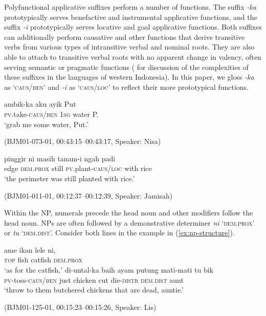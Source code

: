 \documentclass[output=paper,
\ChapterDOI{10.5281/zenodo.15697583}
colorlinks,
citecolor=brown]{langscibook}
\begin{document}
Polyfunctional applicative suffixes perform a number of functions. The suffix \textit{-ka} prototypically serves benefactive and instrumental applicative functions, and the suffix \textit{-i} prototypically serves locative and goal applicative functions. Both suffixes can additionally perform causative and other functions that derive transitive verbs from various types of intransitive verbal and nominal roots. They are also able to attach to transitive verbal roots with no apparent change in valency, often serving semantic or pragmatic functions (\cite[see][]{truong2022neglected,mcdonnell2024applicative} for discussion of the complexities of these suffixes in the languages of western Indonesia). In this paper, we gloss  \textit{-ka} as `\textsc{caus/ben}' and \textit{-i} as `\textsc{caus/loc}' to reflect their more prototypical functions.

\begin{exe}
    \ex\label{ex:appl-ka} 
    \begin{xlist}
        \exi{}
        \gll ambik-ka aku ayik Put\\
        \textsc{pv}.take-\textsc{caus/ben} 1\textsc{sg} water P.\\
        \trans `grab me some water, Put.'
    \end{xlist}
    \hfill (BJM01-073-01, 00:43:15–00:43:17, Speaker: Nisa)
\end{exe}

\begin{exe}
    \ex\label{ex:appl-i} 
    \begin{xlist}
        \exi{}
        \gll pinggir ni masih tanam-i ngah padi\\
        edge \textsc{dem.prox} still \textsc{pv}.plant-\textsc{caus/loc} with rice\\
        \trans `the perimeter was still planted with rice.'
    \end{xlist}
    \hfill (BJM01-011-01, 00:12:37–00:12:39, Speaker: Jamisah)
\end{exe}

Within the NP, numerals precede the head noun and other modifiers follow the head noun. NPs are often followed by a demonstrative determiner \textit{ni} `\textsc{dem.prox}' or \textit{tu} `\textsc{dem.dist}'. Consider both lines in the example in (\ref{ex:np-structure}).

\begin{exe}
    \ex\label{ex:np-structure} 
    \begin{xlist}[0\quad A:]
        \gll ame ikan lele ni,\\
        \textsc{top} fish catfish \textsc{dem.prox} \\
        \trans `as for the catfish,'
        \exi{2\quad \hphantom{L:}}
        \gll di-untal-ka baih ayam putung mati-mati tu bik\\
        \textsc{pv}-toss-\textsc{caus/ben} just chicken cut die-\textsc{distr} \textsc{dem.dist} aunt\\
        \trans `throw to them butchered chickens that are dead, auntie.'
    \end{xlist}
    \hfill (BJM01-125-01, 00:15:23–00:15:26, Speaker: Lis)
\end{exe}
\end{document}
